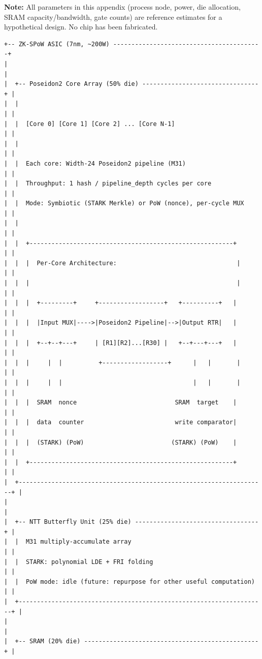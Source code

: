 \documentclass[11pt,a4paper]{article}
\begin{document}
\textbf{Note:} All parameters in this appendix (process node, power, die allocation, SRAM capacity/bandwidth, gate counts) are reference estimates for a hypothetical design. No chip has been fabricated.

\begin{Verbatim}[fontsize=\scriptsize]
+-- ZK-SPoW ASIC (7nm, ~200W) -----------------------------------------+
|                                                                        |
|  +-- Poseidon2 Core Array (50% die) --------------------------------+ |
|  |                                                                    | |
|  |  [Core 0] [Core 1] [Core 2] ... [Core N-1]                        | |
|  |                                                                    | |
|  |  Each core: Width-24 Poseidon2 pipeline (M31)                     | |
|  |  Throughput: 1 hash / pipeline_depth cycles per core               | |
|  |  Mode: Symbiotic (STARK Merkle) or PoW (nonce), per-cycle MUX    | |
|  |                                                                    | |
|  |  +--------------------------------------------------------+       | |
|  |  |  Per-Core Architecture:                                 |       | |
|  |  |                                                         |       | |
|  |  |  +---------+     +------------------+   +----------+   |       | |
|  |  |  |Input MUX|---->|Poseidon2 Pipeline|-->|Output RTR|   |       | |
|  |  |  +--+--+---+     | [R1][R2]...[R30] |   +--+---+---+   |       | |
|  |  |     |  |          +------------------+      |   |       |       | |
|  |  |     |  |                                    |   |       |       | |
|  |  |  SRAM  nonce                           SRAM  target    |       | |
|  |  |  data  counter                         write comparator|       | |
|  |  |  (STARK) (PoW)                        (STARK) (PoW)    |       | |
|  |  +--------------------------------------------------------+       | |
|  +--------------------------------------------------------------------+ |
|                                                                        |
|  +-- NTT Butterfly Unit (25% die) ----------------------------------+ |
|  |  M31 multiply-accumulate array                                     | |
|  |  STARK: polynomial LDE + FRI folding                               | |
|  |  PoW mode: idle (future: repurpose for other useful computation)   | |
|  +--------------------------------------------------------------------+ |
|                                                                        |
|  +-- SRAM (20% die) ------------------------------------------------+ |

\end{Verbatim}
\end{document}
